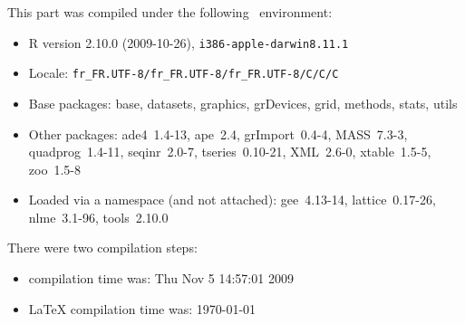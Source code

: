 \documentclass{article}
\begin{document}
\begin{scriptsize}

This part was compiled under the following \Rlogo{}~environment:

\begin{itemize}\raggedright
  \item R version 2.10.0 (2009-10-26), \verb|i386-apple-darwin8.11.1|
  \item Locale: \verb|fr_FR.UTF-8/fr_FR.UTF-8/fr_FR.UTF-8/C/C/C|
  \item Base packages: base, datasets, graphics, grDevices, grid,
    methods, stats, utils
  \item Other packages: ade4~1.4-13, ape~2.4, grImport~0.4-4,
    MASS~7.3-3, quadprog~1.4-11, seqinr~2.0-7, tseries~0.10-21,
    XML~2.6-0, xtable~1.5-5, zoo~1.5-8
  \item Loaded via a namespace (and not attached): gee~4.13-14,
    lattice~0.17-26, nlme~3.1-96, tools~2.10.0
\end{itemize}
There were two compilation steps:

\begin{itemize}
  \item \Rlogo{} compilation time was: Thu Nov  5 14:57:01 2009
  \item \LaTeX{} compilation time was: \today
\end{itemize}

\end{scriptsize}


\clearpage
{}


\end{document}
